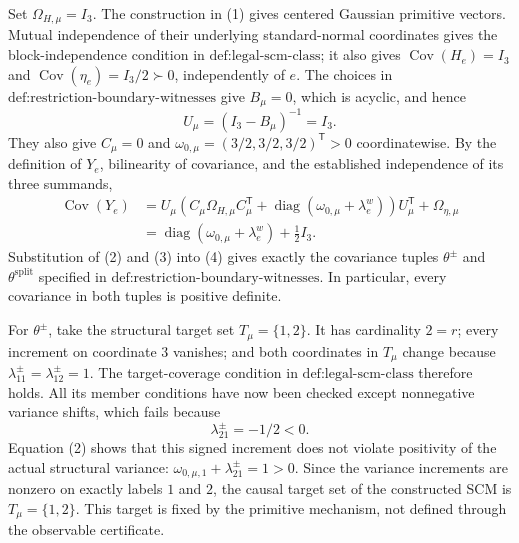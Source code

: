Set \(\Omega_{H,\mu}=I_3\).  The construction in (1) gives centered Gaussian primitive vectors.  Mutual independence of their underlying standard-normal coordinates gives the block-independence condition in \(\text{def:legal-scm-class}\); it also gives \(\operatorname{Cov}(H_e)=I_3\) and \(\operatorname{Cov}(\eta_e)=I_3/2\succ0\), independently of \(e\).  The choices in \(\text{def:restriction-boundary-witnesses}\) give \(B_\mu=0\), which is acyclic, and hence
\[
 U_\mu=(I_3-B_\mu)^{-1}=I_3.
\]
They also give \(C_\mu=0\) and \(\omega_{0,\mu}=(3/2,3/2,3/2)^{\mathsf T}>0\) coordinatewise.  By the definition of \(Y_e\), bilinearity of covariance, and the established independence of its three summands,
\[
 \begin{aligned}
 \operatorname{Cov}(Y_e)
 &=U_\mu\!\left(C_\mu\Omega_{H,\mu}C_\mu^{\mathsf T}
   +\operatorname{diag}(\omega_{0,\mu}+\lambda^w_e)\right)U_\mu^{\mathsf T}
   +\Omega_{\eta,\mu}\\
 &=\operatorname{diag}(\omega_{0,\mu}+\lambda^w_e)+\tfrac12 I_3. 
 \end{aligned} \tag{4}
\]
Substitution of (2) and (3) into (4) gives exactly the covariance tuples \(\theta^{\pm}\) and \(\theta^{\mathrm{split}}\) specified in \(\text{def:restriction-boundary-witnesses}\).  In particular, every covariance in both tuples is positive definite.

For \(\theta^{\pm}\), take the structural target set \(T_\mu=\{1,2\}\).  It has cardinality \(2=r\); every increment on coordinate \(3\) vanishes; and both coordinates in \(T_\mu\) change because \(\lambda^{\pm}_{11}=\lambda^{\pm}_{12}=1\).  The target-coverage condition in \(\text{def:legal-scm-class}\) therefore holds.  All its member conditions have now been checked except nonnegative variance shifts, which fails because
\[
 \lambda^{\pm}_{21}=-1/2<0. \tag{5}
\]
Equation (2) shows that this signed increment does not violate positivity of the actual structural variance: \(\omega_{0,\mu,1}+\lambda^{\pm}_{21}=1>0\).  Since the variance increments are nonzero on exactly labels \(1\) and \(2\), the causal target set of the constructed SCM is \(T_\mu=\{1,2\}\).  This target is fixed by the primitive mechanism, not defined through the observable certificate.

